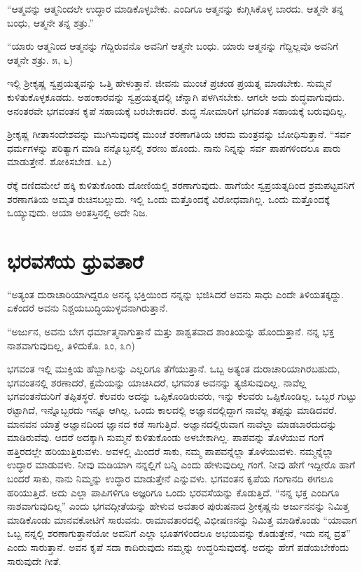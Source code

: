 “ಆತ್ಮವನ್ನು ಆತ್ಮನಿಂದಲೇ ಉದ್ಧಾರ ಮಾಡಿಕೊಳ್ಳಬೇಕು. ಎಂದಿಗೂ ಆತ್ಮನನ್ನು ಕುಗ್ಗಿಸಿಕೊಳ್ಳ ಬಾರದು. ಆತ್ಮನೇ ತನ್ನ ಬಂಧು, ಆತ್ಮನೇ ತನ್ನ ಶತ್ರು.”

“ಯಾರು ಆತ್ಮನಿಂದ ಆತ್ಮನನ್ನು ಗೆದ್ದಿರುವನೊ ಅವನಿಗೆ ಆತ್ಮನೇ ಬಂಧು. ಯಾರು ಆತ್ಮನನ್ನು ಗೆದ್ದಿಲ್ಲವೊ ಅವನಿಗೆ ಆತ್ಮನೇ ಶತ್ರು. ೫, ೬)

ಇಲ್ಲಿ ಶ‍್ರೀಕೃಷ್ಣ ಸ್ವಪ್ರಯತ್ನವನ್ನು ಒತ್ತಿ ಹೇಳುತ್ತಾನೆ. ಜೀವನು ಮುಂಚೆ ಪ್ರಚಂಡ ಪ್ರಯತ್ನ ಮಾಡಬೇಕು. ಸುಮ್ಮನೆ ಕುಳಿತುಕೊಳ್ಳಕೂಡದು. ಅಹಂಕಾರವನ್ನು ಸ್ವಪ್ರಯತ್ನದಲ್ಲಿ ಚೆನ್ನಾಗಿ ಪಳಗಿಸಬೇಕು. ಆಗಲೇ ಅದು ಶುದ್ಧವಾಗುವುದು. ಅನಂತರವೇ ಭಗವಂತನ ಕೃಪೆ ಸಹಾಯಕ್ಕೆ ಬರಬೇಕಾದರೆ. ಶುದ್ಧ ಸೋಮಾರಿಗೆ ಭಗವಂತ ಸಹಾಯಕ್ಕೆ ಬರುವುದಿಲ್ಲ.

ಶ‍್ರೀಕೃಷ್ಣ ಗೀತಾಸಂದೇಶವನ್ನು ಮುಗಿಸುವುದಕ್ಕೆ ಮುಂಚೆ ಶರಣಾಗತಿಯ ಚರಮ ಮಂತ್ರವನ್ನು ಬೋಧಿಸುತ್ತಾನೆ. “ಸರ್ವ ಧರ್ಮಗಳನ್ನು ಪರಿತ್ಯಾಗ ಮಾಡಿ ನನ್ನೊಬ್ಬನಲ್ಲಿ ಶರಣು ಹೊಂದು. ನಾನು ನಿನ್ನನ್ನು ಸರ್ವ ಪಾಪಗಳಿಂದಲೂ ಪಾರು ಮಾಡುತ್ತೇನೆ. ಶೋಕಿಸಬೇಡ. ೬೭)

ರೆಕ್ಕೆ ದಣಿದಮೇಲೆ ಹಕ್ಕಿ ಕುಳಿತುಕೊಂಡು ದೋಣಿಯಲ್ಲಿ ಶರಣಾಗುವುದು. ಹಾಗೆಯೇ ಸ್ವಪ್ರಯತ್ನದಿಂದ ಶ್ರಮಪಟ್ಟವನಿಗೆ ಶರಣಾಗತಿಯ ಅಮೃತ ರುಚಿಸಬಲ್ಲುದು. ಇಲ್ಲಿ ಒಂದು ಮತ್ತೊಂದಕ್ಕೆ ವಿರೋಧವಾಗಿಲ್ಲ. ಒಂದು ಮತ್ತೊಂದಕ್ಕೆ ಒಯ್ಯುವುದು. ಆಯಾ ಅಂತಸ್ತಿನಲ್ಲಿ ಅದೇ ನಿಜ.


\section*{ಭರವಸೆಯ ಧ್ರುವತಾರೆ}

“ಅತ್ಯಂತ ದುರಾಚಾರಿಯಾಗಿದ್ದರೂ ಅನನ್ಯ ಭಕ್ತಿಯಿಂದ ನನ್ನನ್ನು ಭಜಿಸಿದರೆ ಅವನು ಸಾಧು ಎಂದೇ ತಿಳಿಯತಕ್ಕದ್ದು. ಏಕೆಂದರೆ ಅವನು ನಿಶ್ಚಯಬುದ್ಧಿಯುಳ್ಳವನಾಗಿರುತ್ತಾನೆ.

“ಅರ್ಜುನ, ಅವನು ಬೇಗ ಧರ್ಮಾತ್ಮನಾಗುತ್ತಾನೆ ಮತ್ತು ಶಾಶ್ವತವಾದ ಶಾಂತಿಯನ್ನು ಹೊಂದುತ್ತಾನೆ. ನನ್ನ ಭಕ್ತ ನಾಶವಾಗುವುದಿಲ್ಲ, ತಿಳಿದುಕೊ. ೩ಂ, ೩೧)

ಭಗವಂತ ಇಲ್ಲಿ ಮುಕ್ತಿಯ ಹೆಬ್ಬಾಗಿಲನ್ನು ಎಲ್ಲರಿಗೂ ತೆಗೆಯುತ್ತಾನೆ. ಒಬ್ಬ ಅತ್ಯಂತ ದುರಾಚಾರಿಯಾಗಿರಬಹುದು, ಭಗವಂತನಲ್ಲಿ ಶರಣಾದರೆ, ಕ್ಷಮೆಯನ್ನು ಯಾಚಿಸಿದರೆ, ಭಗವಂತ ಅವನನ್ನು ತ್ಯಜಿಸುವುದಿಲ್ಲ. ನಾವೆಲ್ಲ ಭಗವಂತನೆದುರಿಗೆ ತಪ್ಪಿತಸ್ಥರೆ. ಕೆಲವರು ಅದನ್ನು ಒಪ್ಪಿಕೊಂಡಿರುವರು, ಇನ್ನು ಕೆಲವರು ಒಪ್ಪಿಕೊಂಡಿಲ್ಲ. ಒಬ್ಬರ ಗುಟ್ಟು ರಟ್ಟಾಗಿದೆ, ಇನ್ನೊಬ್ಬರದು ಇನ್ನೂ ಆಗಿಲ್ಲ. ಒಂದು ಕಾಲದಲ್ಲಿ ಅಜ್ಞಾನದಲ್ಲಿದ್ದಾಗ ನಾವೆಲ್ಲ ತಪ್ಪನ್ನು ಮಾಡಿದವರೆ. ಮಾನವನ ಯಾತ್ರೆ ಅಜ್ಞಾನದಿಂದ ಜ್ಞಾನದ ಕಡೆ ಸಾಗುತ್ತಿದೆ. ಅಜ್ಞಾನದಲ್ಲಿರುವಾಗ ನಾವೆಲ್ಲಾ ಮಾಡಬಾರ\-ದುದನ್ನು ಮಾಡಿರುವೆವು. ಆದರೆ ಅದಕ್ಕಾಗಿ ಸುಮ್ಮನೆ ಕುಳಿತುಕೊಂಡು ಅಳಬೇಕಾಗಿಲ್ಲ. ಪಾಪವನ್ನು ತೊಳೆಯುವ ಗಂಗೆ ಹತ್ತಿರದಲ್ಲೇ ಹರಿಯುತ್ತಿರುವಳು. ಅವಳಲ್ಲಿ ಮಿಂದರೆ ಸಾಕು, ನಮ್ಮ ಪಾಪವನ್ನೆಲ್ಲಾ ತೊಳೆಯುವಳು. ನಮ್ಮನ್ನೆಲ್ಲಾ ಉದ್ಧಾರ ಮಾಡುವಳು. ನೀವು ಮಡಿಯಾಗಿ ನನ್ನಲ್ಲಿಗೆ ಬನ್ನಿ ಎಂದು ಹೇಳುವುದಿಲ್ಲ ಗಂಗೆ. ನೀವು ಹೇಗೆ ಇದ್ದೀರೊ ಹಾಗೆ ಬಂದರೆ ಸಾಕು, ನಾನು ನಿಮ್ಮನ್ನು ಉದ್ಧಾರ ಮಾಡುತ್ತೇನೆ ಎನ್ನುವಳು. ಭಗವಂತನ ಕೃಪೆಯ ಗಂಗಾನದಿ ಈಗಲೂ ಹರಿಯುತ್ತಿದೆ. ಅದು ಎಲ್ಲಾ ಪಾಪಿಗಳಿಗೂ ಅಜ್ಞರಿಗೂ ಒಂದು ಭರವಸೆಯನ್ನು ಕೊಡುತ್ತಿದೆ. “ನನ್ನ ಭಕ್ತ ಎಂದಿಗೂ ನಾಶವಾಗುವುದಿಲ್ಲ” ಎಂದು ಭಗವದ್ಗೀತೆಯನ್ನು ಹೇಳುವ ಅವತಾರ ಪುರುಷನಾದ ಶ‍್ರೀಕೃಷ್ಣನು ಅರ್ಜುನನನ್ನು ನಿಮಿತ್ತ ಮಾಡಿಕೊಂಡು ಮಾನವಕೋಟಿಗೆ ಸಾರುವನು. ರಾಮಾವತಾರದಲ್ಲಿ ವಿಭೀಷಣನನ್ನು ನಿಮಿತ್ತ ಮಾಡಿಕೊಂಡು “ಯಾವಾಗ ಒಬ್ಬ ನನ್ನಲ್ಲಿ ಶರಣಾಗುತ್ತಾನೆಯೋ ಅವನಿಗೆ ಎಲ್ಲಾ ಭೂತಗಳಿಂದಲೂ ಅಭಯವನ್ನು ಕೊಡುತ್ತೇನೆ, ಇದು ನನ್ನ ವ್ರತ” ಎಂದು ಸಾರುತ್ತಾನೆ. ಅವನ ಕೃಪೆ ಸದಾ ಕಾದಿರುವುದು ನಮ್ಮನ್ನು ಉದ್ಧರಿಸುವುದಕ್ಕೆ. ಅದನ್ನು ಹೇಗೆ ಪಡೆಯಬೇಕೆಂದು ಸಾರುವುದೇ ಗೀತೆ.

